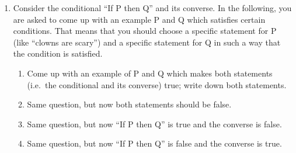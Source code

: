 \begin{enumerate}
    \item Consider the conditional ``If P then Q'' and its converse. In the following, you are asked to come up with an example P and Q which satisfies certain conditions. That means that you should choose a specific statement for P (like ``clowns are scary'') and a specific statement for Q in such a way that the condition is satisfied.
  \begin{enumerate}
      \item Come up with an example of P and Q which makes both statements (i.e.~the conditional and its converse) true; write down both statements.
      \item Same question, but now both statements should be false.
      \item Same question, but now ``If P then Q'' is true and the converse is false.
      \item Same question, but now ``If P then Q'' is false and the converse is true.
  \end{enumerate}
\end{enumerate}
